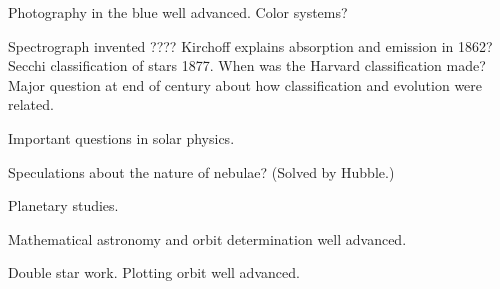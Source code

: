 

Photography in the blue well advanced. Color systems?

Spectrograph invented ???? Kirchoff explains absorption and emission
in 1862?  Secchi classification of stars 1877.  When was the Harvard
classification made? Major question at end of century about how
classification and evolution were related.

Important questions in solar physics.

Speculations about the nature of nebulae?  (Solved by Hubble.)

Planetary studies.

Mathematical astronomy and orbit determination well advanced.

Double star work.  Plotting orbit well advanced.
